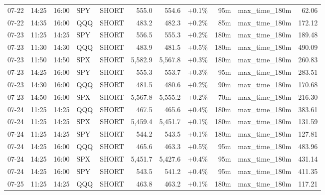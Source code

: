 \documentclass[11pt,a4paper,twoside]{article}
\begin{document}
\begin{center}
\begin{longtable}{>{\color{txtmain}}l l l l l r r r r >{\color{txtmain}}l r}
07-22 & 14:25 & 16:00 & SPY & SHORT & 555.0 & 554.6 & \textcolor{wingreen}{+0.1\%} & 95m & max\_time\_180m & \textcolor{wingreen}{62.06} \\
07-22 & 14:35 & 16:00 & QQQ & SHORT & 483.2 & 482.3 & \textcolor{wingreen}{+0.2\%} & 85m & max\_time\_180m & \textcolor{wingreen}{172.12} \\
07-23 & 11:25 & 14:25 & SPY & SHORT & 556.5 & 555.3 & \textcolor{wingreen}{+0.2\%} & 180m & max\_time\_180m & \textcolor{wingreen}{189.48} \\
07-23 & 11:30 & 14:30 & QQQ & SHORT & 483.9 & 481.5 & \textcolor{wingreen}{+0.5\%} & 180m & max\_time\_180m & \textcolor{wingreen}{490.09} \\
07-23 & 11:50 & 14:50 & SPX & SHORT & 5,582.9 & 5,567.8 & \textcolor{wingreen}{+0.3\%} & 180m & max\_time\_180m & \textcolor{wingreen}{260.83} \\
07-23 & 14:25 & 16:00 & SPY & SHORT & 555.3 & 553.7 & \textcolor{wingreen}{+0.3\%} & 95m & max\_time\_180m & \textcolor{wingreen}{283.51} \\
07-23 & 14:30 & 16:00 & QQQ & SHORT & 481.5 & 480.6 & \textcolor{wingreen}{+0.2\%} & 90m & max\_time\_180m & \textcolor{wingreen}{170.68} \\
07-23 & 14:50 & 16:00 & SPX & SHORT & 5,567.8 & 5,555.2 & \textcolor{wingreen}{+0.2\%} & 70m & max\_time\_180m & \textcolor{wingreen}{216.30} \\
07-24 & 11:25 & 14:25 & QQQ & SHORT & 467.5 & 465.6 & \textcolor{wingreen}{+0.4\%} & 180m & max\_time\_180m & \textcolor{wingreen}{383.61} \\
07-24 & 11:25 & 14:25 & SPX & SHORT & 5,459.4 & 5,451.7 & \textcolor{wingreen}{+0.1\%} & 180m & max\_time\_180m & \textcolor{wingreen}{131.59} \\
07-24 & 11:25 & 14:25 & SPY & SHORT & 544.2 & 543.5 & \textcolor{wingreen}{+0.1\%} & 180m & max\_time\_180m & \textcolor{wingreen}{127.81} \\
07-24 & 14:25 & 16:00 & QQQ & SHORT & 465.6 & 463.3 & \textcolor{wingreen}{+0.5\%} & 95m & max\_time\_180m & \textcolor{wingreen}{483.96} \\
07-24 & 14:25 & 16:00 & SPX & SHORT & 5,451.7 & 5,427.6 & \textcolor{wingreen}{+0.4\%} & 95m & max\_time\_180m & \textcolor{wingreen}{431.14} \\
07-24 & 14:25 & 16:00 & SPY & SHORT & 543.5 & 541.2 & \textcolor{wingreen}{+0.4\%} & 95m & max\_time\_180m & \textcolor{wingreen}{411.35} \\
07-25 & 11:25 & 14:25 & QQQ & SHORT & 463.8 & 463.2 & \textcolor{wingreen}{+0.1\%} & 180m & max\_time\_180m & \textcolor{wingreen}{117.21} \\

\end{longtable}
\end{center}
\end{document}
